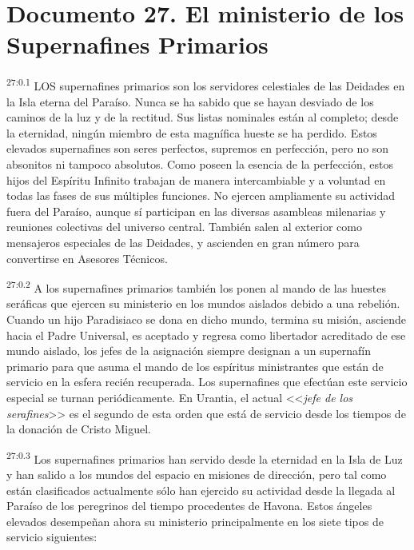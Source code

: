 \chapter{Documento 27. El ministerio de los Supernafines Primarios}
\par
\textsuperscript{27:0.1} LOS supernafines primarios son los servidores celestiales de las Deidades en la Isla eterna del Paraíso. Nunca se ha sabido que se hayan desviado de los caminos de la luz y de la rectitud. Sus listas nominales están al completo; desde la eternidad, ningún miembro de esta magnífica hueste se ha perdido. Estos elevados supernafines son seres perfectos, supremos en perfección, pero no son absonitos ni tampoco absolutos. Como poseen la esencia de la perfección, estos hijos del Espíritu Infinito trabajan de manera intercambiable y a voluntad en todas las fases de sus múltiples funciones. No ejercen ampliamente su actividad fuera del Paraíso, aunque sí participan en las diversas asambleas milenarias y reuniones colectivas del universo central. También salen al exterior como mensajeros especiales de las Deidades, y ascienden en gran número para convertirse en Asesores Técnicos.

\par
\textsuperscript{27:0.2} A los supernafines primarios también los ponen al mando de las huestes seráficas que ejercen su ministerio en los mundos aislados debido a una rebelión. Cuando un hijo Paradisiaco se dona en dicho mundo, termina su misión, asciende hacia el Padre Universal, es aceptado y regresa como libertador acreditado de ese mundo aislado, los jefes de la asignación siempre designan a un supernafín primario para que asuma el mando de los espíritus ministrantes que están de servicio en la esfera recién recuperada. Los supernafines que efectúan este servicio especial se turnan periódicamente. En Urantia, el actual <<\textit{jefe de los serafines}>> es el segundo de esta orden que está de servicio desde los tiempos de la donación de Cristo Miguel.

\par
\textsuperscript{27:0.3} Los supernafines primarios han servido desde la eternidad en la Isla de Luz y han salido a los mundos del espacio en misiones de dirección, pero tal como están clasificados actualmente sólo han ejercido su actividad desde la llegada al Paraíso de los peregrinos del tiempo procedentes de Havona. Estos ángeles elevados desempeñan ahora su ministerio principalmente en los siete tipos de servicio siguientes:

